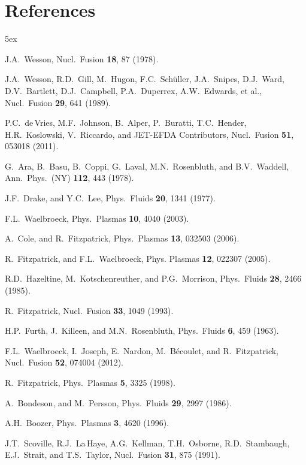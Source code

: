 \documentclass[12pt,prb,aps]{revtex4-1}
\begin{document}
\section*{References}
\begin{thebibliography}{99}\baselineskip 5ex

 J.A.~Wesson, Nucl.\ Fusion {\bf 18}, 87 (1978).

 J.A.~Wesson, R.D.~Gill, M.~Hugon, F.C.~Sch\"{u}ller, J.A.~Snipes, D.J.~Ward, D.V.~Bartlett, 
D.J.~Campbell, P.A.~Duperrex, A.W.~Edwards, et al., Nucl.\ Fusion {\bf 29}, 641 (1989).

 P.C.~de\,Vries, M.F.~Johnson, B.~Alper, P.~Buratti, T.C.~Hender, H.R.~Koslowski, V.~Riccardo, and JET-EFDA Contributors, Nucl.\ Fusion {\bf 51}, 053018 (2011).

 G.~Ara, B.~Basu, B.~Coppi, G.~Laval, M.N.~Rosenbluth, and B.V.~Waddell, Ann.\ Phys.\ (NY) {\bf 112}, 443 (1978).

 J.F.~Drake, and Y.C.~Lee, Phys.\ Fluids {\bf 20}, 1341 (1977).

 F.L.~Waelbroeck, Phys.\ Plasmas {\bf 10}, 4040 (2003).

 A.~Cole, and R.~Fitzpatrick, Phys.\ Plasmas {\bf 13}, 032503 (2006).

 R.~Fitzpatrick, and F.L.~Waelbroeck, Phys. Plasmas {\bf 12}, 022307 (2005).

 R.D.~Hazeltine, M.~Kotschenreuther, and P.G.~Morrison, Phys.\ Fluids {\bf 28}, 2466 (1985).

 R.~Fitzpatrick, Nucl.\ Fusion {\bf 33}, 1049 (1993).

 H.P.~Furth, J.~Killeen, and M.N.~Rosenbluth, Phys.\ Fluids {\bf 6}, 459 (1963).

 F.L.~Waelbroeck,  I.~Joseph, E.~Nardon, M.~B\'{e}coulet, and R.~Fitzpatrick, Nucl.\ Fusion {\bf 52}, 074004 (2012). 

 R.~Fitzpatrick, Phys.\ Plasmas {\bf 5}, 3325 (1998). 

 A.~Bondeson, and M.~Persson, Phys.\ Fluids {\bf 29}, 2997 (1986).

 A.H.~Boozer, Phys.\ Plasmas {\bf 3}, 4620 (1996). 

 J.T.~Scoville, R.J.~La\,Haye, A.G.~Kellman, T.H.~Osborne, R.D.~Stambaugh, E.J.~Strait, and T.S.~Taylor, Nucl.\ Fusion {\bf 31}, 875 (1991).


\end{thebibliography}
\end{document}
